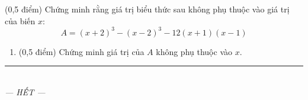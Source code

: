 \documentclass[12pt,a4paper]{article}
\begin{document}
\begin{ex} (0,5 điểm)
Chứng minh rằng giá trị biểu thức sau không phụ thuộc vào giá trị của biến $x$:
$$A = (x + 2)^3 - (x - 2)^3 - 12(x + 1)(x - 1)$$
\begin{enumerate}[label=\textbf{\alph*)}, leftmargin=0.8cm, itemsep=2pt]
\item (0,5 điểm) Chứng minh giá trị của $A$ không phụ thuộc vào $x$.
\end{enumerate}
\end{ex}
\vspace{0.5mm}


\begin{center}
\rule{4cm}{0.4pt}\\
\textit{--- HẾT ---}
\end{center}
\end{document}

